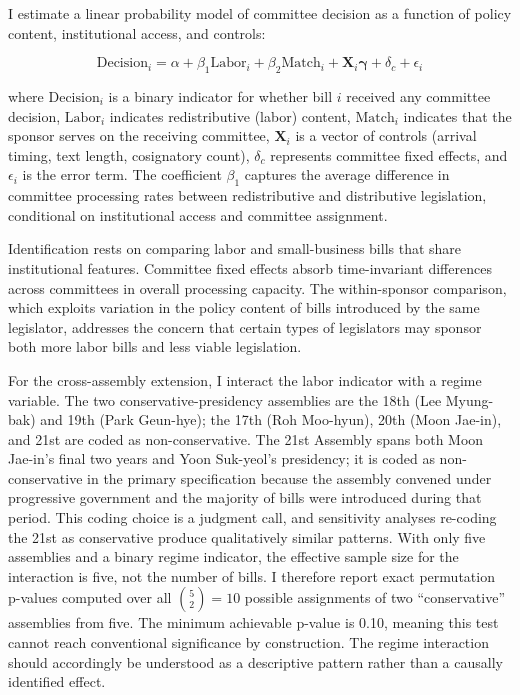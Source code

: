\documentclass[11pt]{article}
\begin{document}
I estimate a linear probability model of committee decision as a function of policy content, institutional access, and controls:

\begin{equation}
\text{Decision}_i = \alpha + \beta_1 \text{Labor}_i + \beta_2 \text{Match}_i + \mathbf{X}_i \boldsymbol{\gamma} + \delta_c + \epsilon_i
\label{eq:main}
\end{equation}

\noindent where $\text{Decision}_i$ is a binary indicator for whether bill $i$ received any committee decision, $\text{Labor}_i$ indicates redistributive (labor) content, $\text{Match}_i$ indicates that the sponsor serves on the receiving committee, $\mathbf{X}_i$ is a vector of controls (arrival timing, text length, cosignatory count), $\delta_c$ represents committee fixed effects, and $\epsilon_i$ is the error term. The coefficient $\beta_1$ captures the average difference in committee processing rates between redistributive and distributive legislation, conditional on institutional access and committee assignment.

Identification rests on comparing labor and small-business bills that share institutional features. Committee fixed effects absorb time-invariant differences across committees in overall processing capacity. The within-sponsor comparison, which exploits variation in the policy content of bills introduced by the same legislator, addresses the concern that certain types of legislators may sponsor both more labor bills and less viable legislation.

For the cross-assembly extension, I interact the labor indicator with a regime variable. The two conservative-presidency assemblies are the 18th (Lee Myung-bak) and 19th (Park Geun-hye); the 17th (Roh Moo-hyun), 20th (Moon Jae-in), and 21st are coded as non-conservative. The 21st Assembly spans both Moon Jae-in's final two years and Yoon Suk-yeol's presidency; it is coded as non-conservative in the primary specification because the assembly convened under progressive government and the majority of bills were introduced during that period. This coding choice is a judgment call, and sensitivity analyses re-coding the 21st as conservative produce qualitatively similar patterns. With only five assemblies and a binary regime indicator, the effective sample size for the interaction is five, not the number of bills. I therefore report exact permutation p-values computed over all $\binom{5}{2} = 10$ possible assignments of two ``conservative'' assemblies from five. The minimum achievable p-value is 0.10, meaning this test cannot reach conventional significance by construction. The regime interaction should accordingly be understood as a descriptive pattern rather than a causally identified effect.
\end{document}
